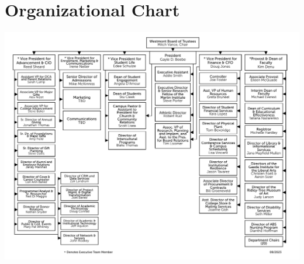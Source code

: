 \section{Organizational Chart}
	\label{sec:OrgChart}

	\begin{center}
		\includegraphics[width=\textwidth]{images/orgchart.pdf}
	\end{center}